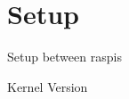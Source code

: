 \documentclass[../main.tex]{subfiles}
\begin{document}
    \clearpage
    \section{Setup}
    Setup between raspis

    Kernel Version
\end{document}
